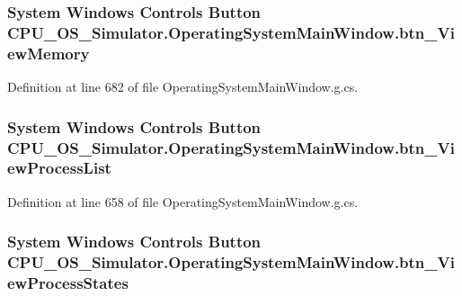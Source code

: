 \subsubsection[{btn\+\_\+\+View\+Memory}]{\setlength{\rightskip}{0pt plus 5cm}System Windows Controls Button C\+P\+U\+\_\+\+O\+S\+\_\+\+Simulator.\+Operating\+System\+Main\+Window.\+btn\+\_\+\+View\+Memory\hspace{0.3cm}{\ttfamily [package]}}\label{class_c_p_u___o_s___simulator_1_1_operating_system_main_window_aea0c29dfb4b666e71108189a8120ec7e}


Definition at line 682 of file Operating\+System\+Main\+Window.\+g.\+cs.

\hypertarget{class_c_p_u___o_s___simulator_1_1_operating_system_main_window_a1e066a439f2a2ae32884c1ab5bc836de}{}
\subsubsection[{btn\+\_\+\+View\+Process\+List}]{\setlength{\rightskip}{0pt plus 5cm}System Windows Controls Button C\+P\+U\+\_\+\+O\+S\+\_\+\+Simulator.\+Operating\+System\+Main\+Window.\+btn\+\_\+\+View\+Process\+List\hspace{0.3cm}{\ttfamily [package]}}\label{class_c_p_u___o_s___simulator_1_1_operating_system_main_window_a1e066a439f2a2ae32884c1ab5bc836de}


Definition at line 658 of file Operating\+System\+Main\+Window.\+g.\+cs.

\hypertarget{class_c_p_u___o_s___simulator_1_1_operating_system_main_window_a1f057538601b02d66df09bcc72059591}{}
\subsubsection[{btn\+\_\+\+View\+Process\+States}]{\setlength{\rightskip}{0pt plus 5cm}System Windows Controls Button C\+P\+U\+\_\+\+O\+S\+\_\+\+Simulator.\+Operating\+System\+Main\+Window.\+btn\+\_\+\+View\+Process\+States\hspace{0.3cm}{\ttfamily [package]}}\label{class_c_p_u___o_s___simulator_1_1_operating_system_main_window_a1f057538601b02d66df09bcc72059591}


